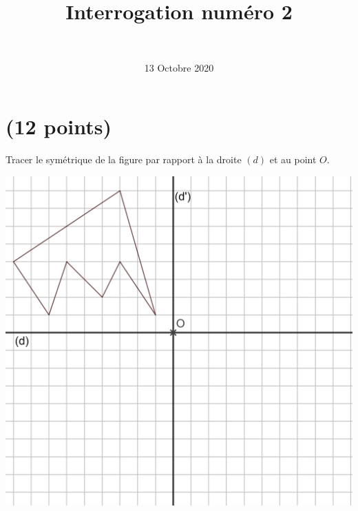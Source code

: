 \documentclass[a4paper,11pt]{exam}
\author{\ }
\date{13 Octobre 2020}
\title{Interrogation num\'ero 2}
\begin{document}
%	

\maketitle




\section{(12 points)}

Tracer le symétrique de la figure par rapport à la droite $(d)$ et au point $O$.

\begin{center}
	\includegraphics[scale=0.20]{img/fig1_2}
\end{center}
\end{document}
